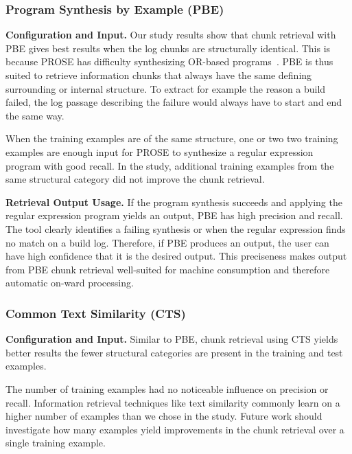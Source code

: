 \subsubsection{Program Synthesis by Example (PBE)}

\noindent
\textbf{Configuration and Input.}
Our study results show that chunk retrieval with PBE gives best
results when the log chunks are structurally identical.
This is
because PROSE has difficulty synthesizing OR-based
programs~\cite{mayer2015user}.
PBE is thus suited to retrieve information
chunks that always have the same defining surrounding or internal
structure.
To extract for example the reason a build failed, the log
passage describing the failure would always have to start and
end the same way.

When the training examples are of the same structure, one or two
two training examples are enough input for PROSE to synthesize a regular
expression program with good recall.
In the study, additional training
examples from the same structural category
did not improve the chunk retrieval.

\noindent
\textbf{Retrieval Output Usage.}
If the program synthesis succeeds and applying the regular expression
program yields an output, PBE has high precision and recall.
The tool
clearly identifies a failing synthesis or when the regular expression
finds no match on a build log.
Therefore, if PBE produces
an output, the user can have high confidence that it is the desired
output.
This preciseness makes output from PBE chunk retrieval
well-suited for machine consumption and therefore automatic on-ward
processing.

\subsubsection{Common Text Similarity (CTS)}
\noindent
\textbf{Configuration and Input.}
Similar to PBE, chunk retrieval using CTS yields better results the
fewer structural categories are present in the training and test
examples.

The number of training examples had no noticeable influence on
precision or recall.
Information retrieval techniques
like text similarity commonly learn on a higher number of examples
than we chose in the study.
Future work should investigate how many
examples yield improvements in the chunk retrieval over a single
training example.

